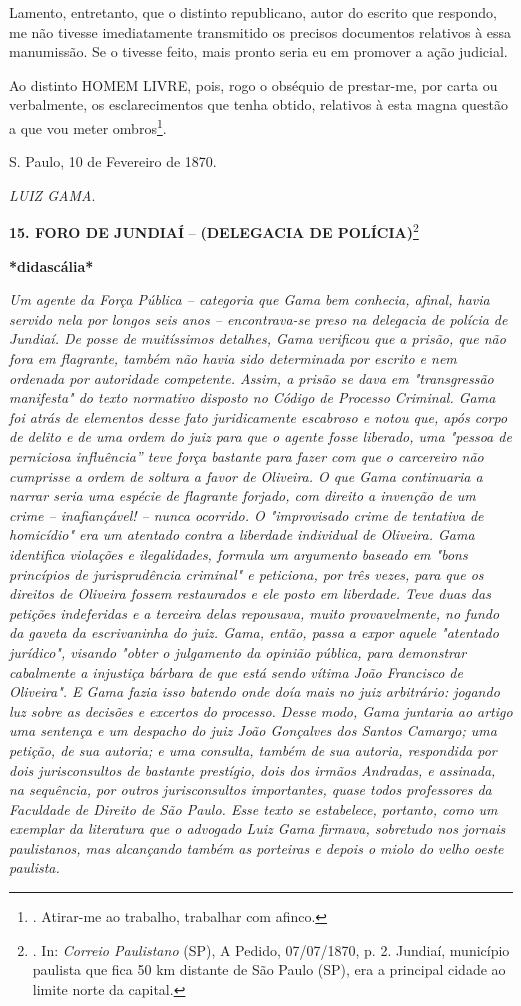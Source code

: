 Lamento, entretanto, que o distinto republicano, autor do escrito que
respondo, me não tivesse imediatamente transmitido os precisos
documentos relativos à essa manumissão. Se o tivesse feito, mais pronto
seria eu em promover a ação judicial.

Ao distinto HOMEM LIVRE, pois, rogo o obséquio de prestar-me, por carta
ou verbalmente, os esclarecimentos que tenha obtido, relativos à esta
magna questão a que vou meter ombros\footnote{. Atirar-me ao trabalho,
  trabalhar com afinco.}.

S. Paulo, 10 de Fevereiro de 1870.

\emph{LUIZ GAMA}.

\textbf{15. FORO DE JUNDIAÍ} -- \textbf{(DELEGACIA DE
POLÍCIA)}\footnote{. In: \emph{Correio Paulistano} (SP), A Pedido,
  07/07/1870, p. 2. Jundiaí, município paulista que fica 50 km distante
  de São Paulo (SP), era a principal cidade ao limite norte da capital.}

\textbf{*didascália*}

\emph{Um agente da Força Pública -- categoria que Gama bem conhecia,
afinal, havia servido nela por longos seis anos -- encontrava-se preso
na delegacia de polícia de Jundiaí. De posse de muitíssimos detalhes,
Gama verificou que a prisão, que não fora em flagrante, também não havia
sido determinada por escrito e nem ordenada por autoridade competente.
Assim, a prisão se dava em "transgressão manifesta" do texto normativo
disposto no Código de Processo Criminal. Gama foi atrás de elementos
desse fato juridicamente escabroso e notou que, após corpo de delito e
de uma ordem do juiz para que o agente fosse liberado, uma "pessoa de
perniciosa influência'' teve força bastante para fazer com que o
carcereiro não cumprisse a ordem de soltura a favor de Oliveira. O que
Gama continuaria a narrar seria uma espécie de flagrante forjado, com
direito a invenção de um crime -- inafiançável! -- nunca ocorrido. O
"improvisado crime de tentativa de homicídio" era um atentado contra a
liberdade individual de Oliveira. Gama identifica violações e
ilegalidades, formula um argumento baseado em "bons princípios de
jurisprudência criminal" e peticiona, por três vezes, para que os
direitos de Oliveira fossem restaurados e ele posto em liberdade. Teve
duas das petições indeferidas e a terceira delas repousava, muito
provavelmente, no fundo da gaveta da escrivaninha do juiz. Gama, então,
passa a expor aquele "atentado jurídico", visando "obter o julgamento da
opinião pública, para demonstrar cabalmente a injustiça bárbara de que
está sendo vítima João Francisco de Oliveira". E Gama fazia isso batendo
onde doía mais no juiz arbitrário: jogando luz sobre as decisões e
excertos do processo. Desse modo, Gama juntaria ao artigo uma sentença e
um despacho do juiz João Gonçalves dos Santos Camargo; uma petição, de
sua autoria; e uma consulta, também de sua autoria, respondida por dois
jurisconsultos de bastante prestígio, dois dos irmãos Andradas, e
assinada, na sequência, por outros jurisconsultos importantes, quase
todos professores da Faculdade de Direito de São Paulo. Esse texto se
estabelece, portanto, como um exemplar da literatura que o advogado Luiz
Gama firmava, sobretudo nos jornais paulistanos, mas alcançando também
as porteiras e depois o miolo do velho oeste paulista. }

